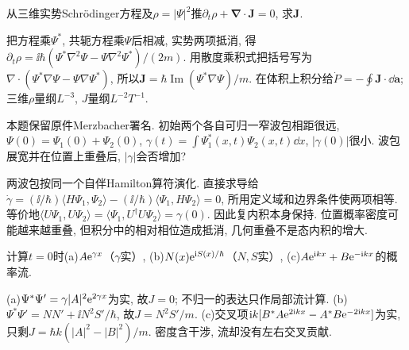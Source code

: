 \begin{exercise}从三维实势Schrödinger方程及$\rho=|\Psi|^2$推$\partial_t\rho+\boldsymbol\nabla\cdot\boldsymbol J=0$, 求$\boldsymbol J$.\end{exercise}
\begin{solution}把方程乘$\Psi^*$, 共轭方程乘$\Psi$后相减, 实势两项抵消, 得$\partial_t\rho=\ii\hbar(\Psi^*\nabla^2\Psi-\Psi\nabla^2\Psi^*)/(2m)$. 用散度乘积式把括号写为$\nabla\cdot(\Psi^*\nabla\Psi-\Psi\nabla\Psi^*)$, 所以$\boldsymbol J=\hbar\operatorname{Im}(\Psi^*\nabla\Psi)/m$. 在体积上积分给$\dot P=-\oint\boldsymbol J\cdot\dd\boldsymbol a$; 三维$\rho$量纲$L^{-3}$, $J$量纲$L^{-2}T^{-1}$.\end{solution}
\begin{exercise}
本题保留原件Merzbacher署名. 初始两个各自可归一窄波包相距很远, $\Psi(0)=\Psi_1(0)+\Psi_2(0)$, $\gamma(t)=\int\Psi_1^*(x,t)\Psi_2(x,t)\dd x$, $|\gamma(0)|$很小. 波包展宽并在位置上重叠后, $|\gamma|$会否增加?
\end{exercise}
\begin{solution}
两波包按同一个自伴Hamilton算符演化. 直接求导给$\dot\gamma=(\ii/\hbar)\langle H\Psi_1,\Psi_2\rangle-(\ii/\hbar)\langle\Psi_1,H\Psi_2\rangle=0$, 所用定义域和边界条件使两项相等. 等价地$\langle U\Psi_1,U\Psi_2\rangle=\langle\Psi_1,U^\dagger U\Psi_2\rangle=\gamma(0)$. 因此复内积本身保持. 位置概率密度可能越来越重叠, 但积分中的相对相位造成抵消, 几何重叠不是态内积的增大.
\end{solution}
\begin{exercise}计算$t=0$时(a)$A\mathrm e^{\gamma x}$（$\gamma$实）, (b)$N(x)\mathrm e^{\mathrm i S(x)/\hbar}$（$N,S$实）, (c)$A\mathrm e^{\mathrm i kx}+B\mathrm e^{-\mathrm i kx}$的概率流.\end{exercise}
\begin{solution}(a)$\Psi^*\Psi'=\gamma|A|^2\mathrm e^{2\gamma x}$为实, 故$J=0$; 不归一的表达只作局部流计算. (b)$\Psi^*\Psi'=NN'+\ii N^2S'/\hbar$, 故$J=N^2S'/m$. (c)交叉项$\mathrm i k[B^*A\mathrm e^{2\mathrm i kx}-A^*B\mathrm e^{-2\mathrm i kx}]$为实, 只剩$J=\hbar k(|A|^2-|B|^2)/m$. 密度含干涉, 流却没有左右交叉贡献.\end{solution}
